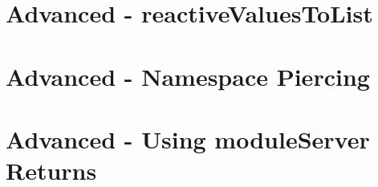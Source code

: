 \documentclass[11pt, letterpaper]{article}
\begin{document}
\clearpage
\section{Advanced - reactiveValuesToList}


\clearpage
\section{Advanced - Namespace Piercing}


\clearpage
\section{Advanced - Using moduleServer Returns}

\end{document}
